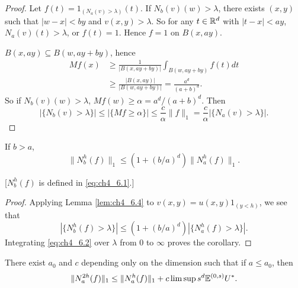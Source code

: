 \begin{proof}
Let $f(t) = 1_{(N_a(v)>\lambda)}(t)$. If $N_b(v)(w) > \lambda$, there exists $(x,y)$ such that $|w-x| < by$ and $v(x,y) > \lambda$. So for any $t \in \mathbb{R}^d$ with $|t-x| < ay$, $N_a(v)(t) > \lambda$, or $f(t) = 1$. Hence $f = 1$ on $B(x,ay)$.

$B(x,ay) \subseteq B(w,ay+by)$, hence
\begin{align*}
    Mf(x) &\geq \frac{1}{|B(x,ay+by)|} \int_{B(w,ay+by)} f(t)dt \\
    &\geq \frac{|B(x,ay)|}{|B(w,ay+by)|} = \frac{a^d}{(a+b)^d}.
\end{align*}
So if $N_b(v)(w) > \lambda$, $Mf(w) \geq \alpha = a^d/(a+b)^d$. Then
\[
    |\{N_b(v) > \lambda\}| \leq |\{Mf \geq \alpha\}| \leq \frac{c}{\alpha}\|f\|_1 = \frac{c}{\alpha}|\{N_a(v) > \lambda\}|.
\]
\end{proof}

\begin{corollary}\label{cor:ch4_6.5}
If $b > a$,
\[
    \|N_b^h(f)\|_1 \leq (1+(b/a)^d)\|N_a^h(f)\|_1.
\]
\end{corollary}

[$N_b^h(f)$ is defined in \eqref{eq:ch4_6.1}.]

\begin{proof}
Applying Lemma \ref{lem:ch4_6.4} to $v(x,y) = u(x,y)1_{(y<h)}$, we see that
\begin{equation}\label{eq:ch4_6.2}
|\{N_b^h(f) > \lambda\}| \leq (1+(b/a)^d)|\{N_a^h(f) > \lambda\}|.
\end{equation}
Integrating \eqref{eq:ch4_6.2} over $\lambda$ from $0$ to $\infty$ proves the corollary.
\end{proof}

\begin{lemma}\label{lem:ch4_6.6}
There exist $a_0$ and $c$ depending only on the dimension such that if $a \leq a_0$, then
\[
    \|N_a^{2h}(f)\|_1 \leq \|N_a^h(f)\|_1 + c\limsup s^d\mathbb{E}^{(0,s)}U^*.
\]
\end{lemma}

